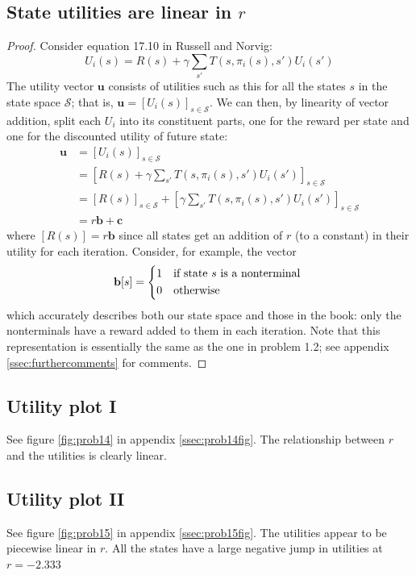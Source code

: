 \documentclass[letterpaper, 10pt]{article}
\begin{document}
\begin{multicols*}{2}
\subsection{State utilities are linear in $r$}
\begin{proof}
Consider equation 17.10 in Russell and Norvig:
\[ U_i(s) = R(s) + \gamma \sum_{s'} T(s, \pi_i(s), s') U_i(s') \]
The utility vector $\mathbf{u}$ consists of utilities such as this for all the states $s$ in the state space $\mathcal{S}$; that is, $\mathbf{u} = [U_i(s)]_{s \in \mathcal{S}}$.
We can then, by linearity of vector addition, split each $U_i$ into its constituent parts, one for the reward per state and one for the discounted utility of future state:
\begin{align*}
\mathbf{u} &= [U_i(s)]_{s \in \mathcal{S}} \\
&= \left[ R(s) + \gamma \sum_{s'} T(s, \pi_i(s), s') U_i(s') \right]_{s \in \mathcal{S}} \\
&= [R(s)]_{s \in \mathcal{S}} + \left[ \gamma \sum_{s'} T(s, \pi_i(s), s') U_i(s') \right]_{s \in \mathcal{S}} \\
&= r\mathbf{b} + \mathbf{c}
\end{align*}
where $[R(s)] = r\mathbf{b}$ since all states get an addition of $r$ (to a constant) in their utility for each iteration.
Consider, for example, the vector
\[
\mathbf{b}[s] = \begin{dcases*}
1 & if state $s$ is a nonterminal \\
0 & otherwise
\end{dcases*}
\]
which accurately describes both our state space and those in the book: only the nonterminals have a reward added to them in each iteration.
Note that this representation is essentially the same as the one in problem 1.2; see appendix \ref{ssec:furthercomments} for comments.
\end{proof}

\subsection{Utility plot I}
See figure \ref{fig:prob14} in appendix \ref{ssec:prob14fig}. The relationship between $r$ and the utilities is clearly linear.

\subsection{Utility plot II}
See figure \ref{fig:prob15} in appendix \ref{ssec:prob15fig}. 
The utilities appear to be piecewise linear in $r$. 
All the states have a large negative jump in utilities at $r = -2.333$


\end{multicols*}
\end{document}
